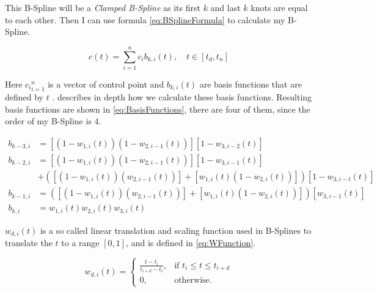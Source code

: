 \documentclass[a4paper,12pt]{extarticle}
\begin{document}
This B-Spline will be a \emph{Clamped B-Spline} as its first $k$ and last $k$ knots are equal to each other. Then I can use formula \cref{eq:BSplineFormula} to calculate my B-Spline.

\begin{equation}
c(t)= \sum_{i=1}^{n} c_i b_{k,i}(t), \quad t \in \left[t_d,t_n\right]
\label{eq:BSplineFormula}
\end{equation}

Here ${c_i}_{i=1}^n$ is a vector of control point and $b_{k,i}(t)$ are basis functions that are defined by $t$ \citep[Chap 5.5.1]{Laksa2012}. \citep[Chap 5.5.3]{Laksa2012} describes in depth how we calculate these basis functions. Resulting basis functions are shown in \cref{eq:BasisFunctions}, there are four of them, since the order of my B-Spline is $4$.

\begin{equation}
\begin{split}
b_{k-3,i} &= \left[ \left( 1-w_{1,i}(t) \right) \left( 1-w_{2,i-1}(t) \right) \right] \left[ 1-w_{3,i-2}(t) \right]\\
b_{k-2,i} &= \left[ \left( 1-w_{1,i}(t) \right) \left( 1-w_{2,i-1}(t) \right) \right] \left[ 1-w_{3,i-1}(t) \right]\\ &+ \left( \left[ \left( 1-w_{1,i}(t) \right) \left( w_{2,i-1}(t) \right) \right] + \left[ w_{1,i}(t) \left( 1-w_{2,i}(t) \right) \right] \right) \left[ 1-w_{3,i-t}(t) \right]\\
b_{k-1,i} &= \left( \left[ \left( 1-w_{1,i}(t) \right) \left( w_{2,i-1}(t) \right) \right] + \left[ w_{1,i}(t) \left( 1-w_{2,i}(t) \right) \right] \right) \left[ w_{3,i-1}(t) \right]\\
b_{k,i} &= w_{1,i}(t) w_{2,i}(t) w_{3,i}(t)
\label{eq:BasisFunctions}
\end{split}
\end{equation}

$w_{d,i}(t)$ is a so called linear translation and scaling function used in B-Splines to translate the $t$ to a range $[0,1]$, and is defined in \cref{eq:WFunction}.

\begin{equation}
  w_{d,i}(t) = 		
  \begin{cases}
    \frac{t-t_i}{t_{i+d} - t_i}, & \text{if } t_i \leq t \leq t_{i+d}\\
    0, & \text{otherwise.}
  \end{cases}
  \label{eq:WFunction}
\end{equation}
\end{document}
